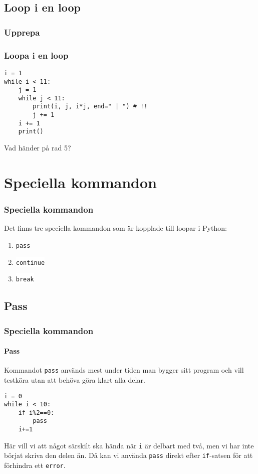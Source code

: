\documentclass[aspectratio=169]{beamer}
\newcommand{\code}[1]{\colorbox{white}{\lstinline{#1}}}
\begin{document}
\subsection{Loop i en loop}

\begin{frame}[fragile]
	\frametitle{Upprepa}
	\frametitle{Loopa i en loop}
	
	\begin{lstlisting}
i = 1
while i < 11:
    j = 1
    while j < 11:
        print(i, j, i*j, end=" | ") # !!
        j += 1
    i += 1
    print()
	\end{lstlisting}
	
	Vad händer på rad 5?

\end{frame}

\section{Speciella kommandon}

\begin{frame}
	\frametitle{Speciella kommandon}
	
	Det finns tre speciella kommandon som är kopplade till loopar i Python:
	
	\begin{enumerate}
		\item \code{pass}
		\item \code{continue}
		\item \code{break}
	\end{enumerate}
	
\end{frame}

\subsection{Pass}

\begin{frame}[fragile]
	\frametitle{Speciella kommandon}
	\framesubtitle{Pass}
	
	Kommandot \code{pass} används mest under tiden man bygger sitt program och vill testköra utan att behöva göra klart alla delar.
	
	\begin{lstlisting}
i = 0
while i < 10:
    if i%2==0:
        pass
    i+=1
	\end{lstlisting}
	
	Här vill vi att något särskilt ska hända när \code{i} är delbart med två, men vi har inte börjat skriva den delen än. Då kan vi använda \code{pass} direkt efter \code{if}-satsen för att förhindra ett \code{error}.
	
\end{frame}
\end{document}
